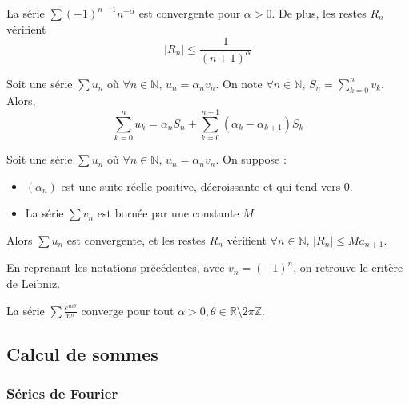 
  \begin{example}
    La série $\sum (-1)^{n-1} n^{-\alpha}$ est convergente pour $\alpha > 0$. De plus, les restes $R_n$ vérifient
    \[ |R_n| \leq \frac{1}{(n+1)^\alpha} \]
  \end{example}


  \begin{proposition}
    Soit une série $\sum u_n$ où $\forall n \in \mathbb{N}, \, u_n = \alpha_n v_n$. On note $\forall n \in \mathbb{N}, \, S_n = \sum_{k=0}^n v_k$. Alors,
    \[ \sum_{k=0}^n u_k = \alpha_n S_n + \sum_{k=0}^{n-1} (\alpha_k - \alpha_{k+1}) S_k \]
  \end{proposition}


  \begin{corollary}
    Soit une série $\sum u_n$ où $\forall n \in \mathbb{N}, \, u_n = \alpha_n v_n$. On suppose :
    \begin{itemize}
      \item $(\alpha_n)$ est une suite réelle positive, décroissante et qui tend vers $0$.
      \item La série $\sum v_n$ est bornée par une constante $M$.
    \end{itemize}
    Alors $\sum u_n$ est convergente, et les restes $R_n$ vérifient $\forall n \in \mathbb{N}, \, |R_n| \leq M a_{n+1}$.
  \end{corollary}


  \begin{remark}
    En reprenant les notations précédentes, avec $v_n = (-1)^n$, on retrouve le critère de Leibniz.
  \end{remark}

  \begin{example}
    La série $\sum \frac{e^{ni\theta}}{n^\alpha}$ converge pour tout $\alpha > 0, \theta \in \mathbb{R} \setminus 2 \pi \mathbb{Z}$.
  \end{example}

  \subsection{Calcul de sommes}

  \subsubsection{Séries de Fourier}

